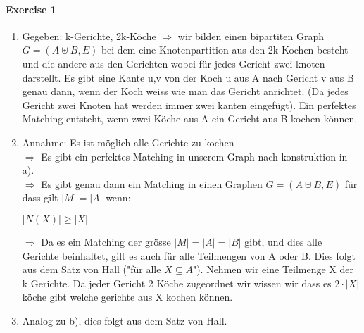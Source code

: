 \documentclass{report}
\begin{document}
\paragraph{Exercise 1}
\begin{enumerate}[label = \alph*)]
\item Gegeben: k-Gerichte,  2k-Köche
$\Rightarrow$ wir bilden einen bipartiten Graph $G=(A\uplus B,E)$ bei dem eine Knotenpartition aus den 2k Kochen besteht und die andere aus den Gerichten wobei für jedes Gericht zwei knoten darstellt. Es gibt eine Kante {u,v} von der Koch u aus A nach Gericht v aus B genau dann, wenn der Koch weiss wie man das Gericht anrichtet. (Da jedes Gericht zwei Knoten hat werden immer zwei kanten eingefügt). Ein perfektes Matching entsteht, wenn zwei Köche aus A ein Gericht aus B kochen können.
\item Annahme: Es ist möglich alle Gerichte zu kochen\\
$\Rightarrow$ Es gibt ein perfektes Matching in unserem Graph nach konstruktion in a).\\
$\Rightarrow$ Es gibt genau dann ein Matching in einen Graphen $G=(A \uplus B,E)$ für dass gilt $|M|=|A|$ wenn:
\begin{center}
$|N(X)| \geq |X|$
\end{center}
$\Rightarrow$ Da es ein Matching der grösse $|M| = |A| =|B|$ gibt, und dies alle Gerichte beinhaltet, gilt es auch für alle Teilmengen von A oder B. Dies folgt aus dem Satz von Hall ("für alle $X\subseteq A$"). Nehmen wir eine Teilmenge X der k Gerichte. Da jeder Gericht 2 Köche zugeordnet wir wissen wir dass es $2\cdot|X|$ köche gibt welche gerichte aus X kochen können.
\item Analog zu b), dies folgt aus dem Satz von Hall.
\end{enumerate}
\end{document}
